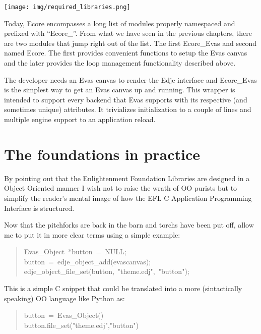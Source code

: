 \documentclass[12pt,a4paper,english]{book}
\begin{document}
{\hfill\texttt{[image: img/required\_libraries.png]}\hfill}

Today, Ecore encompasses a long list of modules properly namespaced and
prefixed with ``Ecore{\_}''. From what we have seen in the previous chapters, there
are two modules that jump right out of the list. The first Ecore{\_}Evas and
second named Ecore. The first provides convenient functions to setup the Evas
canvas and the later provides the loop management functionality described
above.

The developer needs an Evas canvas to render the Edje interface and Ecore{\_}Evas
is the simplest way to get an Evas canvas up and running. This wrapper is
intended to support every backend that Evas supports with its respective (and
sometimes unique) attributes. It trivializes initialization to a couple of
lines and multiple engine support to an application reload.



\hypertarget{the-foundations-in-practice}{}
\chapter{The foundations in practice}
\label{the-foundations-in-practice}

By pointing out that the Enlightenment Foundation Libraries are designed in a
Object Oriented manner I wish not to raise the wrath of OO purists but to
simplify the reader's mental image of how the EFL C Application Programming
Interface is structured.

Now that the pitchforks are back in the barn and torchs have been put off,
allow me to put it in more clear terms using a simple example:
\begin{quote}{\ttfamily \raggedright \noindent
Evas{\_}Object~*button~=~NULL;~\\
button~=~edje{\_}object{\_}add(evascanvas);~\\
edje{\_}object{\_}file{\_}set(button,~"theme.edj",~"button");
}\end{quote}

This is a simple C snippet that could be translated into a more (sintactically
speaking) OO language like Python as:
\begin{quote}{\ttfamily \raggedright \noindent
button~=~Evas{\_}Object()~\\
button.file{\_}set("theme.edj","button")
}\end{quote}
\end{document}

